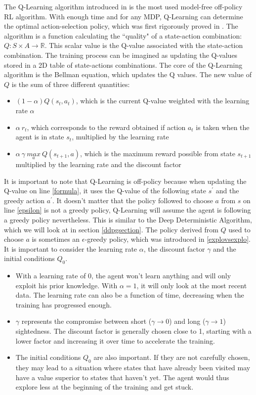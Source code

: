 The Q-Learning algorithm introduced in \cite{watkins1989} is the most used model-free off-policy RL algorithm. With enough time and for any MDP, Q-Learning can determine the optimal action-selection policy, which was first rigorously proved in \cite{qlearningconvergence}. The algorithm is a function calculating the ``quality" of a state-action combination: $Q: S \times A \rightarrow \mathbb{R}$. This scalar value is the Q-value associated with the state-action combination. The training process can be imagined as updating the Q-values stored in a 2D table of state-actions combinations. The core of the Q-Learning algorithm is the Bellman equation, which updates the Q values. The new value of $Q$ is the sum of three different quantities: 

\begin{itemize}
	\item $(1-\alpha)Q(s_t,a_t)$, which is the current Q-value weighted with the learning rate $\alpha$
	\item $\alpha \: r_t$, which corresponds to the reward obtained if action $a_t$ is taken when the agent is in state $s_t$, multiplied by the learning rate
	\item $\alpha \: \gamma \: \underset{a}{max} \: Q(s_{t+1},a)$, which is the maximum reward possible from state $s_{t+1}$ multiplied by the learning rate and the discount factor
\end{itemize}

It is important to note that Q-Learning is off-policy because when updating the Q-value on line \ref{formula}, it uses the Q-value of the following state $s^{'}$ and the greedy action $a^{'}$. It doesn't matter that the policy followed to choose $a$ from $s$ on line \ref{epsilon} is not a greedy policy, Q-Learning will assume the agent is following a greedy policy nevertheless. This is similar to the Deep Deterministic Algorithm, which we will look at in section \ref{ddpgsection}.
The policy derived from $Q$ used to choose $a$ is sometimes an $\epsilon$-greedy policy, which was introduced in \ref{explovsexplo}. 
\newline
It is important to consider the learning rate $\alpha$, the discount factor $\gamma$ and the initial conditions $Q_0$.
\begin{itemize}
	\item With a learning rate of 0, the agent won't learn anything and will only exploit his prior knowledge. With $\alpha = 1$, it will only look at the most recent data. The learning rate can also be a function of time, decreasing when the training has progressed enough.
	\item $\gamma$ represents the compromise between short ($\gamma \rightarrow 0$) and long ($\gamma \rightarrow 1$) sightedness. The discount factor is generally chosen close to 1, starting with a lower factor and increasing it over time to accelerate the training.
	\item The initial conditions $Q_0$ are also important. If they are not carefully chosen, they may lead to a situation where states that have already been visited may have a value superior to states that haven't yet. The agent would thus explore less at the beginning of the training and get stuck.
\end{itemize}

